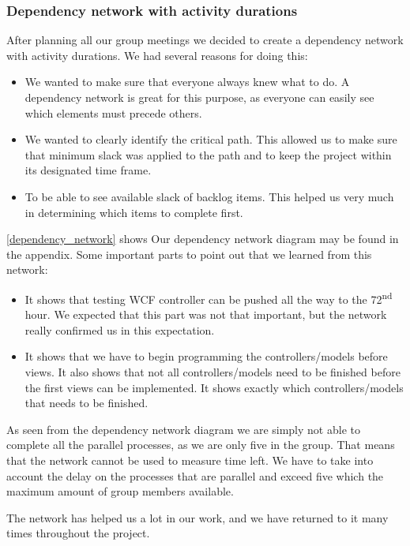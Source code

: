 \subsubsection{Dependency network with activity durations}
After planning all our group meetings we decided to create a dependency network with activity durations. We had several reasons for doing this:

\begin{itemize}
	\item We wanted to make sure that everyone always knew what to do. A dependency network is great for this purpose, as everyone can easily see which elements must precede others.
	\item We wanted to clearly identify the critical path. This allowed us to make sure that minimum slack was applied to the path and to keep the project within its designated time frame.
	\item To be able to see available slack of backlog items. This helped us very much in determining which items to complete first.
\end{itemize}

\cref{dependency_network} shows Our dependency network diagram may be found in the appendix.
Some important parts to point out that we learned from this network:
\begin{itemize}
	\item It shows that testing WCF controller can be pushed all the way to the 72\textsuperscript{nd} hour. We expected that this part was not that important, but the network really confirmed us in this expectation.
	\item It shows that we have to begin programming the controllers/models before views. It also shows that not all controllers/models need to be finished before the first views can be implemented. It shows exactly which controllers/models that needs to be finished.
\end{itemize}

As seen from the dependency network diagram we are simply not able to complete all the parallel processes, as we are only five in the group. That means that the network cannot be used to measure time left. We have to take into account the delay on the processes that are parallel and exceed five which the maximum amount of group members available.

The network has helped us a lot in our work, and we have returned to it many times throughout the project.